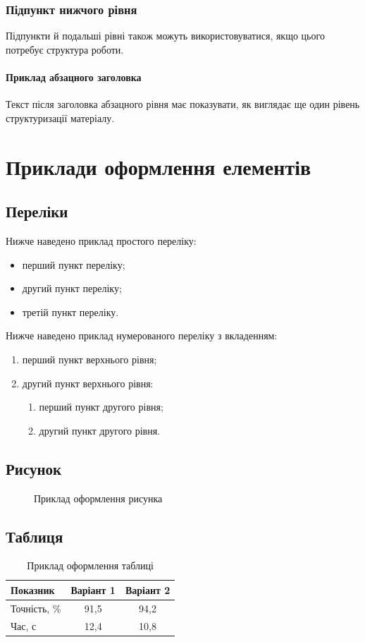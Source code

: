 ﻿\documentclass[14pt]{extarticle}
\begin{document}
\subsubsection{Підпункт нижчого рівня}
Підпункти й подальші рівні також можуть використовуватися, якщо цього потребує структура роботи.

\paragraph{Приклад абзацного заголовка}
Текст після заголовка абзацного рівня має показувати, як виглядає ще один рівень структуризації матеріалу.

\section{Приклади оформлення елементів}
\subsection{Переліки}
Нижче наведено приклад простого переліку:
\begin{itemize}
  \item перший пункт переліку;
  \item другий пункт переліку;
  \item третій пункт переліку.
\end{itemize}

Нижче наведено приклад нумерованого переліку з вкладенням:
\begin{enumerate}
  \item перший пункт верхнього рівня;
  \item другий пункт верхнього рівня:
  \begin{enumerate}
    \item перший пункт другого рівня;
    \item другий пункт другого рівня.
  \end{enumerate}
\end{enumerate}

\subsection{Рисунок}
\begin{figure}[htbp]
  \centering
  \fbox{\rule{0pt}{45mm}\rule{0.72\textwidth}{0pt}}
  \caption{Приклад оформлення рисунка}
  \label{fig:demo}
\end{figure}

\subsection{Таблиця}
\begin{table}
  \caption{Приклад оформлення таблиці}
  \label{tab:demo}
  \centering
  \begin{tabular}{|l|c|c|}
    \hline
    Показник & Варіант 1 & Варіант 2 \\
    \hline
    Точність, \% & 91{,}5 & 94{,}2 \\
    \hline
    Час, с & 12{,}4 & 10{,}8 \\
    \hline
  \end{tabular}
\end{table}
\end{document}

